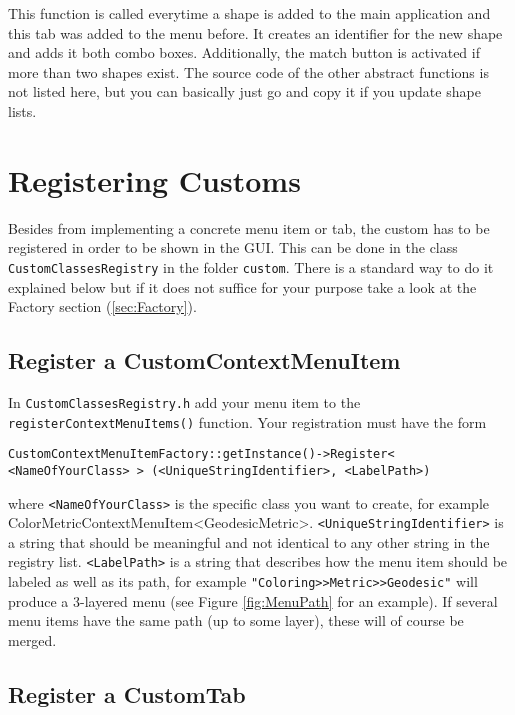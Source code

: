 This function is called everytime a shape is added to the main application and this tab was added to the menu before. It creates an identifier for the new shape and adds it both combo boxes. Additionally, the match button is activated if more than two shapes exist. The source code of the other abstract functions is not listed here, but you can basically just go and copy it if you update shape lists. 

\section{Registering Customs}
\label{sec:RegisterCustoms}

Besides from implementing a concrete menu item or tab, the custom has to be registered in order to be shown in the GUI. This can be done in the class \texttt{CustomClassesRegistry} in the folder \texttt{custom}. There is a standard way to do it explained below but if it does not suffice for your purpose take a look at the Factory section (\ref{sec:Factory}).

\subsection{Register a CustomContextMenuItem}
\label{subsec:RegisterMenuItem}

In \texttt{CustomClassesRegistry.h} add your menu item to the \texttt{registerContextMenuItems()} function. Your registration must have the form 

\texttt{CustomContextMenuItemFactory::getInstance()->Register< <NameOfYourClass> > \linebreak
	\hspace*{2ex}(<UniqueStringIdentifier>, <LabelPath>)}
	
where \texttt{<NameOfYourClass>} is the specific class you want to create, for example ColorMetricContextMenuItem<GeodesicMetric>. \texttt{<UniqueStringIdentifier>} is a string that should be meaningful and not identical to any other string in the registry list. \texttt{<LabelPath>} is a string that describes how the menu item should be labeled as well as its path, for example \texttt{"Coloring>>Metric>>Geodesic"} will produce a 3-layered menu (see Figure \ref{fig:MenuPath} for an example). If several menu items have the same path (up to some layer), these will of course be merged.

\subsection{Register a CustomTab}
\label{subsec:RegisterTab}

